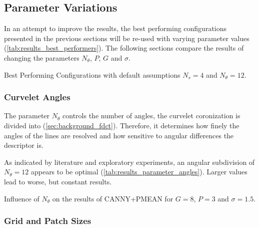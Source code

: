 \subsection{Parameter Variations}\label{sec:results_parameters}

In an attempt to improve the results, the best performing configurations
presented in the previous sections will be re-used with varying parameter
values (\autoref{tab:results_best_performers}). The following sections compare
the results of changing the parameters $N_{\theta}$, $P$, $G$ and $\sigma$.

\begin{table}[h]
    \centering
    \resultsbestperformers
    \caption[Best Performing Configurations]{
        Best Performing Configurations with default assumptions $N_s=4$ and
        $N_{\theta}=12$.
    }
    \label{tab:results_best_performers}
\end{table}

\FloatBarrier
\subsubsection{Curvelet Angles}

The parameter $N_{\theta}$ controls the number of angles, the curvelet
coronization is divided into (\autoref{sec:background_fdct}).  Therefore, it
determines how finely the angles of the lines are resolved and how sensitive to
angular differences the descriptor is.

As indicated by literature and exploratory experiments, an angular subdivision
of $N_{\theta} = 12$ appears to be optimal
(\autoref{tab:results_parameter_angles}). Larger values lead to worse, but
constant results.

\begin{table}[h]
    \centering
    \resultsparameterangles
    \caption[Angle Parameter Results]{
        Influence of $N_{\theta}$ on the results of CANNY+PMEAN for $G=8$,
        $P=3$ and $\sigma=1.5$.
    }
    \label{tab:results_parameter_angles}
\end{table}

\FloatBarrier
\subsubsection{Grid and Patch Sizes}


